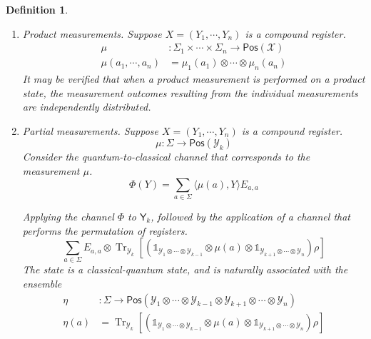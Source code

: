 \documentclass[aps,pra,onecolumn,notitlepage,superscriptaddress]{revtex4-1}
\newcommand{\reg}[1]{\mathsf{#1}}
\newcommand{\spc}[1]{\mathcal{#1}}
\newcommand{\Pos}{\mathsf{Pos}}
\def\>{\rangle}
\def\<{\langle}
\newcommand{\Tr}{\operatorname{Tr}}
\newcommand\I{\mathds{1}}
\newtheorem{defi}{Definition}
\begin{document}
    \begin{defi}
        \begin{enumerate}
            \item Product measurements. Suppose $X = (Y_1 , \cdots, Y_n)$ is a compound register. 
            \begin{align}
                \mu &: \Sigma_1 \times \cdots \times \Sigma_n \to \Pos(\spc X) \\
                \mu(a_1, \cdots, a_n) &= \mu_1(a_1) \otimes \cdots \otimes \mu_n(a_n)
            \end{align}
            It may be verified that when a product measurement is performed on a product state, the measurement outcomes resulting from the individual measurements are independently distributed.
            \item Partial measurements. Suppose $X = (Y_1 , \cdots, Y_n)$ is a compound register. 
            \begin{equation}
                \mu : \Sigma \to \Pos(\spc Y_k)
            \end{equation}
            Consider the quantum-to-classical channel that corresponds to the measurement $\mu$.
            \begin{equation}
                \Phi(Y) = \sum_{a \in \Sigma} \< \mu(a), Y \> E_{a,a}
            \end{equation}

            Applying the channel $\Phi$ to $\reg Y_k$,  followed by the application of a channel that performs the permutation of registers.
            \begin{equation}
                \sum_{a \in \Sigma} E_{a,a} \otimes \Tr_{\spc Y_k}[(\I_{\spc Y_{1} \otimes \cdots \otimes \spc Y_{k-1}} \otimes \mu(a) \otimes \I_{\spc Y_{k+1} \otimes \cdots \otimes \spc Y_{n}})\rho]
            \end{equation}
            The state is a classical-quantum state, and is naturally associated with the ensemble
            \begin{align}
                \eta &: \Sigma \to \Pos(\spc Y_{1} \otimes \cdots \otimes \spc Y_{k-1} \otimes \spc Y_{k+1} \otimes \cdots \otimes \spc Y_{n}) \\
                \eta(a) &= \Tr_{\spc Y_k}[(\I_{\spc Y_{1} \otimes \cdots \otimes \spc Y_{k-1}} \otimes \mu(a) \otimes \I_{\spc Y_{k+1} \otimes \cdots \otimes \spc Y_{n}})\rho]
            \end{align}
        \end{enumerate}
    \end{defi}
\end{document}

